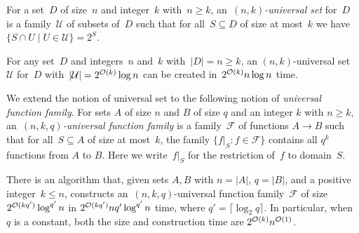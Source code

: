 For a set~$D$ of size~$n$ and integer~$k$ with~$n \geq k$, an~\emph{$(n,k)$-universal set} for~$D$ is a family~$\mathcal{U}$ of subsets of~$D$ such that for all~$S \subseteq D$ of size at most~$k$ we have~$\{S \cap U \mid U \in \mathcal{U}\} = 2^S$.

\begin{theorem} \label{thm:universal-set}
 For any set~$D$ and integers~$n$ and~$k$ with~$|D| = n \geq k$, an $(n,k)$-universal set~$\mathcal{U}$ for~$D$ with~$|\mathcal{U}| = 2^{\mathcal{O}(k)}\log n$ can be created in~$2^{\mathcal{O}(k)} n \log n$ time.
\end{theorem}

We extend the notion of universal set to the following notion of \emph{universal function family}.
For sets $A$ of size $n$ and $B$ of size $q$ and an integer $k$ with $n \geq k$,
an~\emph{$(n,k,q)$-universal function family} is a family~$\mathcal{F}$ of functions $A \to B$
such that for all~$S \subseteq A$ of size at most~$k$, the family $\{{f|}_{S} \colon f \in \mathcal{F} \}$ contains all $q^k$ functions from $A$ to $B$. Here we write~$f|_{S}$ for the restriction of~$f$ to domain~$S$.

\begin{corollary}\label{cor:universal-partition}
	There is an algorithm that, given sets $A,B$ with $n=|A|$, $q=|B|$,
	and a positive integer~$k \leq n$, constructs an~$(n,k,q)$-universal function family~$\mathcal{F}$ of size
  $2^{\mathcal{O}(k q')} \log^{q'} n$
  in $2^{\mathcal{O}(k q')} nq' \log^{q'} n$ time, where $q'=\lceil\log_2 q\rceil$.
  In particular, when $q$ is a constant, both the size and construction time are $2^{\mathcal{O}(k)} n^{\mathcal{O}(1)}$.
\end{corollary}

